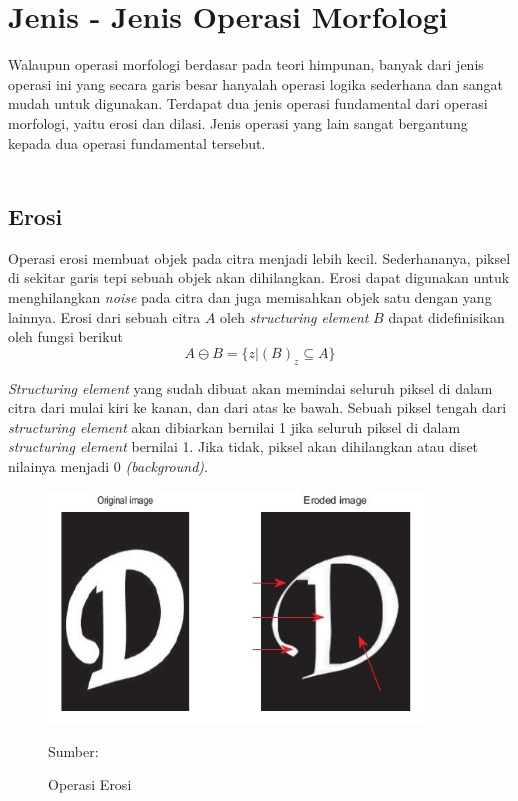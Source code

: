 \section{Jenis - Jenis Operasi Morfologi}
    Walaupun operasi morfologi berdasar pada teori himpunan, banyak dari jenis operasi ini yang secara garis besar hanyalah operasi logika sederhana dan sangat mudah untuk digunakan. Terdapat dua jenis operasi fundamental dari operasi morfologi, yaitu erosi dan dilasi. Jenis operasi yang lain sangat bergantung kepada dua operasi fundamental tersebut.\\\\
    
    \subsection{Erosi}
        Operasi erosi membuat objek pada citra menjadi lebih kecil. Sederhananya, piksel di sekitar garis tepi sebuah objek akan dihilangkan. Erosi dapat digunakan untuk menghilangkan \textit{noise} pada citra dan juga memisahkan objek satu dengan yang lainnya. Erosi dari sebuah citra $A$ oleh \textit{structuring element} $B$ dapat didefinisikan oleh fungsi berikut
        \begin{equation}\label{eq:2.13}
        A \ominus B = \{z | (B)_z \subseteq A\}
        \end{equation}
        
        \textit{Structuring element} yang sudah dibuat akan memindai seluruh piksel di dalam citra dari mulai kiri ke kanan, dan dari atas ke bawah. Sebuah piksel tengah dari \textit{structuring element} akan dibiarkan bernilai 1 jika seluruh piksel di dalam \textit{structuring element} bernilai 1. Jika tidak, piksel akan dihilangkan atau diset nilainya menjadi 0 \textit{(background)}.
        \begin{figure}[H]
        \centering
          \singlespacing
          \includegraphics[width=10cm]{image/erosi.jpg}
          \caption{Operasi Erosi}
          \small{Sumber: \citet{Srisha2013}}
          \label{fig:Erosi}
        \end{figure}
    
